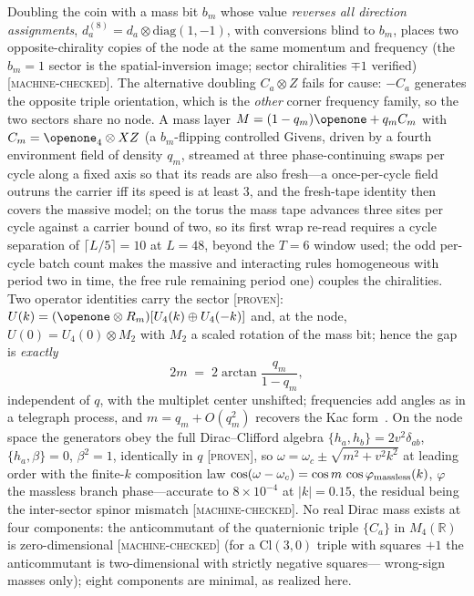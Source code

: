 \documentclass[aps,prd,twocolumn,superscriptaddress,nofootinbib,floatfix]{revtex4-2}
\newcommand{\evP}{\textnormal{\textsc{[proven]}}}
\newcommand{\evM}{\textnormal{\textsc{[machine-checked]}}}
\begin{document}
Doubling the coin with a mass bit $b_m$ whose value \emph{reverses all
direction assignments}, $d^{(8)}_a=d_a\otimes\mathrm{diag}(1,-1)$, with
conversions blind to $b_m$, places two opposite-chirality copies of the
node at the same momentum and frequency (the $b_m{=}1$ sector is the
spatial-inversion image; sector chiralities $\mp1$ verified) \evM{}. The
alternative doubling $C_a\otimes Z$ fails for cause: $-C_a$ generates the
opposite triple orientation, which is the \emph{other} corner frequency
family, so the two sectors share no node. A mass layer
$M=(1-q_m)\openone+q_m C_m$ with $C_m=\openone_4\otimes XZ$ (a
$b_m$-flipping controlled Givens, driven by a fourth environment field of
density $q_m$, streamed at three phase-continuing swaps per cycle along a
fixed axis so that its reads are also fresh---a once-per-cycle field
outruns the carrier iff its speed is at least $3$, and the fresh-tape
identity then covers the massive model; on the torus the mass tape
advances three sites per cycle against a carrier bound of two, so its
first wrap re-read requires a cycle separation of $\lceil L/5\rceil=10$
at $L=48$, beyond the $T=6$ window used; the odd per-cycle batch count
makes the massive and interacting rules homogeneous with period two in
time, the free rule remaining period one) couples the chiralities. Two operator identities carry the
sector \evP{}: $U(k)=(\openone\otimes R_m)[U_4(k)\oplus U_4(-k)]$ and, at
the node, $U(0)=U_4(0)\otimes M_2$ with $M_2$ a scaled rotation of the mass
bit; hence the gap is \emph{exactly}
\begin{equation}
2m \;=\; 2\arctan\!\frac{q_m}{1-q_m},
\label{eq:massgap}
\end{equation}
independent of $q$, with the multiplet center unshifted; frequencies add
angles as in a telegraph process, and $m=q_m+O(q_m^2)$ recovers the Kac
form~\cite{Kac}. On the node space the generators obey the full Dirac--Clifford
algebra $\{h_a,h_b\}=2v^2\delta_{ab}$, $\{h_a,\beta\}=0$, $\beta^2=1$,
identically in $q$ \evP{}, so
$\omega=\omega_c\pm\sqrt{m^2+v^2k^2}$ at leading order with the
finite-$k$ composition law
$\cos(\omega-\omega_c)=\cos m\,\cos\varphi_{\rm massless}(k)$,
$\varphi$ the massless branch phase---accurate to $8\times10^{-4}$ at
$|k|=0.15$, the residual being the inter-sector spinor mismatch
\evM{}.
No real Dirac mass exists at four components: the anticommutant of the
quaternionic triple $\{C_a\}$ in $M_4(\mathbb R)$ is zero-dimensional
\evM{} (for a $\mathrm{Cl}(3,0)$ triple with squares $+1$ the
anticommutant is two-dimensional with strictly negative squares---
wrong-sign masses only); eight components are minimal, as realized here.
\end{document}
